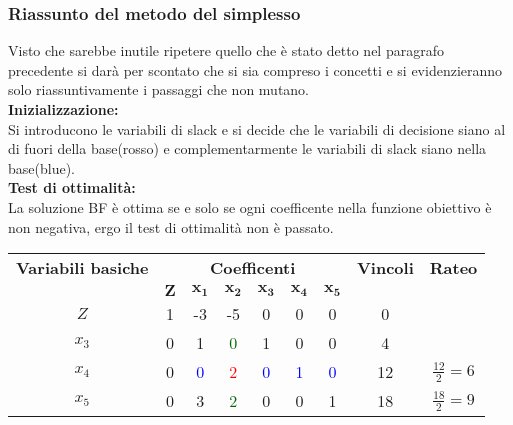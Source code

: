 \documentclass{article}
\begin{document}
\subsubsection{Riassunto del metodo del simplesso}
Visto che sarebbe inutile ripetere quello che è stato detto nel paragrafo precedente si darà per scontato che si sia compreso i concetti e si evidenzieranno solo riassuntivamente i passaggi che non mutano. \\
\textbf{Inizializzazione:} \\
Si introducono le variabili di slack e si decide che le variabili di decisione siano al di fuori della base(rosso) e complementarmente le variabili di slack siano nella base(blue). \\
\textbf{Test di ottimalità:} \\
La soluzione BF è ottima se e solo se ogni coefficente nella funzione obiettivo è non negativa, ergo il test di ottimalità non è passato.\\
\begin{table}[h]
  \centering
  \begin{tabular}{|c|c|c|c|c|c|c|c|c|}
    \hline
    {\textbf{Variabili basiche}} & \multicolumn{6}{|c|}{\textbf{Coefficenti}} & \textbf{Vincoli}    & \textbf{Rateo}                                                                                                     \\
    \cline{1-9}
                                 & $\mathbf{Z}$                               & $\mathbf{x_1}$      & $\mathbf{x_2}$           & $\mathbf{x_3}$      & $\mathbf{x_4}$      & $\mathbf{x_5}$      &    &                  \\
    \hline
    $Z$                          & 1                                          & -3                  & -5                       & 0                   & 0                   & 0                   & 0  &                  \\
    $x_3$                        & 0                                          & 1                   & \textcolor{darkgreen}{0} & 1                   & 0                   & 0                   & 4  &                  \\
    $x_4$                        & 0                                          & \textcolor{blue}{0} & \textcolor{red}{2}       & \textcolor{blue}{0} & \textcolor{blue}{1} & \textcolor{blue}{0} & 12 & $\frac{12}{2}=6$ \\
    $x_5$                        & 0                                          & 3                   & \textcolor{darkgreen}{2} & 0                   & 0                   & 1                   & 18 & $\frac{18}{2}=9$ \\
    \hline
  \end{tabular}
\end{table}
\end{document}

